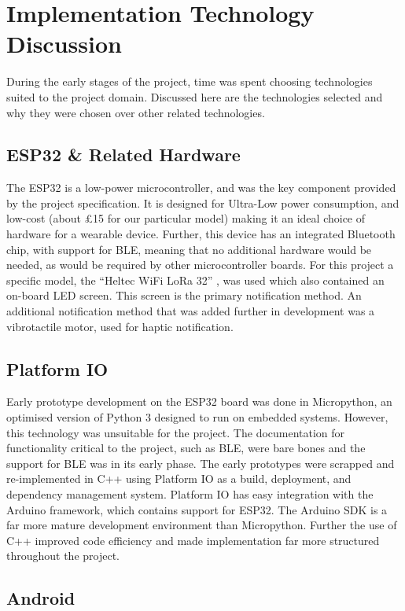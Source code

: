 \documentclass{l4proj}
\begin{document}
\section{Implementation Technology Discussion}

During the early stages of the project, time was spent choosing technologies suited to the project domain. Discussed here are the technologies selected and why they were chosen over other related technologies.

\subsection{ESP32 \& Related Hardware}

The ESP32 is a low-power microcontroller, and was the key component provided by the project specification. It is designed for Ultra-Low power consumption, and low-cost (about £15 for our particular model) making it an ideal choice of hardware for a wearable device. Further, this device has an integrated Bluetooth chip, with support for BLE, meaning that no additional hardware would be needed, as would be required by other microcontroller boards. For this project a specific model, the “Heltec WiFi LoRa 32” \citep{heltec_automation_wifi_nodate}, was used which also contained an on-board LED screen. This screen is the primary notification method. An additional notification method that was added further in development was a vibrotactile motor, used for haptic notification.

\subsection{Platform IO}

Early prototype development on the ESP32 board was done in Micropython, an optimised version of Python 3 designed to run on embedded systems. However, this technology was unsuitable for the project. The documentation for functionality critical to the project, such as BLE, were bare bones and the support for BLE was in its early phase. The early prototypes were scrapped and re-implemented in C++ using Platform IO as a build, deployment, and dependency management system. Platform IO has easy integration with the Arduino framework, which contains support for ESP32. The Arduino SDK is a far more mature development environment than Micropython. Further the use of C++ improved code efficiency and made implementation far more structured throughout the project.

\subsection{Android}
\end{document}
